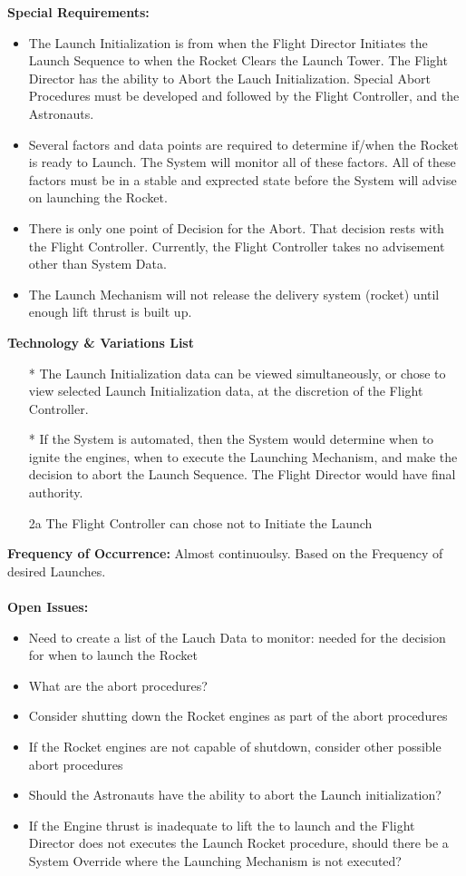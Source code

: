 \documentclass[letterpaper]{article}
\begin{document}
\textbf{Special Requirements:}
\begin{itemize}
\item The Launch Initialization is from when the Flight Director
Initiates the Launch Sequence to when the Rocket Clears the Launch
Tower.  The Flight Director has the ability to Abort the Lauch
Initialization.  Special Abort Procedures must be developed and
followed by the Flight Controller, and the Astronauts.
\item Several factors and data points are required to determine
if/when the Rocket is ready to Launch.  The System will monitor all
of these factors.  All of these factors must be in a stable and
exprected state before the System will advise on launching the Rocket.
\item There is only one point of Decision for the Abort.  That decision
rests with the Flight Controller.  Currently, the Flight Controller
takes no advisement other than System Data.
\item The Launch Mechanism will not release the delivery system
(rocket) until enough lift thrust is built up.
\end{itemize}
\textbf{Technology \& Variations List}
\begin{itemize}
\item[*] The Launch Initialization data can be viewed simultaneously,
or chose to view selected Launch Initialization data, at the discretion
of the Flight Controller.
\item[*]  If the System is automated, then the System would determine
when to ignite the engines, when  to execute the Launching
Mechanism, and make the decision to abort the Launch Sequence.  The
Flight Director would have final authority.
\item[2a]The Flight Controller can chose not to Initiate the Launch
\end{itemize}
\textbf{Frequency of Occurrence:  }Almost continuoulsy.  Based on the
Frequency of desired Launches.\\\\
\textbf{Open Issues:  }
\begin{itemize}
\item Need to create a list of the Lauch Data to monitor:  needed for
the decision for when to launch the Rocket
\item What are the abort procedures?
\item Consider shutting down the Rocket engines as part of the abort
procedures
\item If the Rocket engines are not capable of shutdown, consider
other possible abort procedures
\item Should the Astronauts have the ability to abort the Launch
initialization?
\item If the Engine thrust is inadequate to lift the to launch and
the Flight Director does not executes the Launch Rocket procedure,
should there be a System Override where the Launching Mechanism is not
executed?
\end{itemize}
\end{document}
